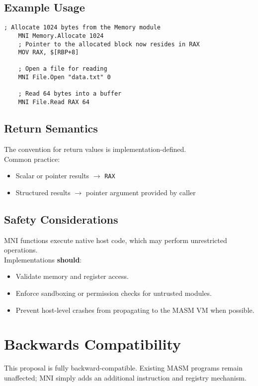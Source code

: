 \documentclass[11pt]{article}
\begin{document}
	\subsection{Example Usage}
	\begin{lstlisting}[language=MicroASM]
	; Allocate 1024 bytes from the Memory module
	MNI Memory.Allocate 1024
	; Pointer to the allocated block now resides in RAX
	MOV RAX, $[RBP+8]

	; Open a file for reading
	MNI File.Open "data.txt" 0

	; Read 64 bytes into a buffer
	MNI File.Read RAX 64
	\end{lstlisting}

	\subsection{Return Semantics}
	The convention for return values is implementation-defined.\\
	Common practice:
	\begin{itemize}
		\item Scalar or pointer results $\rightarrow$ \texttt{RAX}
		\item Structured results $\rightarrow$ pointer argument provided by caller
	\end{itemize}

	\subsection{Safety Considerations}
	MNI functions execute native host code, which may perform unrestricted operations.\\
	Implementations \textbf{should}:
	\begin{itemize}
		\item Validate memory and register access.
		\item Enforce sandboxing or permission checks for untrusted modules.
		\item Prevent host-level crashes from propagating to the MASM VM when possible.
	\end{itemize}
	
	\section{Backwards Compatibility}
	This proposal is fully backward-compatible.  
	Existing MASM programs remain unaffected; MNI simply adds an additional instruction and registry mechanism.
	
\end{document}
